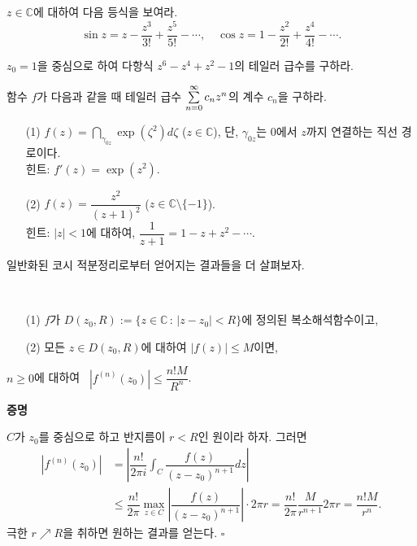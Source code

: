 \begin{salt_exercise} \label{ex-4-12}
$z\in\mathbb C$에 대하여 다음 등식을 보여라.
\[
\sin z = z - \dfrac{z^3}{3!} + \dfrac{z^5}{5!} - \cdots,
\quad
\cos z = 1 - \dfrac{z^2}{2!} + \dfrac{z^4}{4!} - \cdots.
\]
\end{salt_exercise}

\begin{salt_exercise} \label{ex-4-13}
$z_0=1$을 중심으로 하여
다항식 $z^6-z^4 + z^2 -1$의 테일러 급수를 구하라.
\end{salt_exercise}

\begin{salt_exercise} \label{ex-4-14}
함수 $f$가 다음과 같을 때 테일러 급수 $\sum\limits_{n=0}^\infty c_nz^n$의 계수 $c_n$을 구하라.
\begin{itemize}
\item[(1)] $f(z) = \dint_{\gamma_{0z}} \exp(\zeta^2)d\zeta$ ($z\in\mathbb C$),
단, $\gamma_{0z}$는 $0$에서 $z$까지 연결하는 직선 경로이다. \\
힌트: $f'(z) = \exp(z^2)$.
\item[(2)] $f(z) = \dfrac{z^2}{(z+1)^2}$ ($z\in \mathbb C\setminus \{-1\}$). \\
힌트: $|z|<1$에 대하여, $\dfrac1{z+1} = 1- z + z^2 - \cdots$.
\end{itemize}
\end{salt_exercise}

일반화된 코시 적분정리로부터 얻어지는 결과들을 더 살펴보자.

\begin{salt_corollary}[코시 부등식] \label{coro-4-5}
\ 
\begin{itemize}
\item[(1)] $f$가 $D(z_0, R):= \{z \in \mathbb C\,:\, |z-z_0| <R \}$에 정의된
복소해석함수이고,
\item[(2)] 모든 $z\in D(z_0,R)$에 대하여 $|f(z)|\le M$이면,
\end{itemize}
$n\ge0$에 대하여  \ $|f^{(n)}(z_0)| \le \dfrac{n! M}{R^n}$.
\end{salt_corollary}

{\bf 증명}

$C$가 $z_0$를 중심으로 하고 반지름이 $r<R$인 원이라 하자. 그러면
\begin{align*}
|f^{(n)}(z_0)| &= \left| \dfrac{n!}{2\pi i} \int_C \dfrac{f(z)}{(z-z_0)^{n+1}}dz \right| \\
&\le \dfrac{n!}{2\pi} \max_{z\in C} \left| \dfrac{f(z)}{(z-z_0)^{n+1}} \right| \cdot 
2\pi r = \dfrac{n!}{2\pi} \dfrac{M}{r^{n+1}}2\pi r = \dfrac{n! M}{r^n}.
\end{align*}
극한 $r\nearrow R$을 취하면 원하는 결과를 얻는다. 
\hfill $\square$

